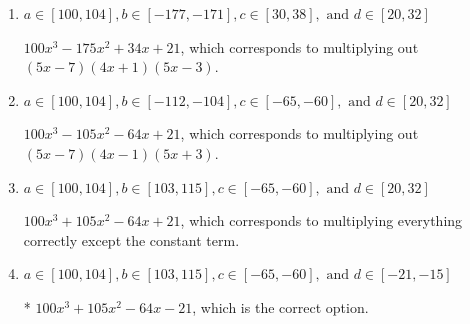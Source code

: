 \documentclass{extbook}[14pt]
\begin{document}
\begin{enumerate}
{\begin{enumerate}[label=\Alph*.]
$100x^{3} -225 x^{2} +134 x -21$, which corresponds to multiplying out $(5x -7)(4x -1)(5x -3)$.
\item \( a \in [100, 104], b \in [-177, -171], c \in [30, 38], \text{ and } d \in [20, 32] \)

$100x^{3} -175 x^{2} +34 x + 21$, which corresponds to multiplying out $(5x -7)(4x + 1)(5x -3)$.
\item \( a \in [100, 104], b \in [-112, -104], c \in [-65, -60], \text{ and } d \in [20, 32] \)

$100x^{3} -105 x^{2} -64 x + 21$, which corresponds to multiplying out $(5x -7)(4x -1)(5x + 3)$.
\item \( a \in [100, 104], b \in [103, 115], c \in [-65, -60], \text{ and } d \in [20, 32] \)

$100x^{3} +105 x^{2} -64 x + 21$, which corresponds to multiplying everything correctly except the constant term.
\item \( a \in [100, 104], b \in [103, 115], c \in [-65, -60], \text{ and } d \in [-21, -15] \)

* $100x^{3} +105 x^{2} -64 x -21$, which is the correct option.
\end{enumerate}

}
\end{enumerate}
\end{document}
